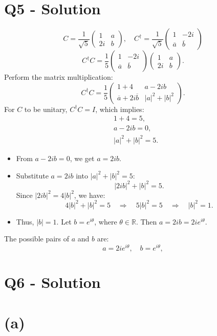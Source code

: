 \documentclass{article}
\begin{document}
\section*{Q5 - Solution}
\[
C = \frac{1}{\sqrt{5}} \begin{pmatrix} 1 & a \\  2i & b \end{pmatrix}, \quad
C^\dagger = \frac{1}{\sqrt{5}} \begin{pmatrix} 1 & -2i \\ \overline{a} & \overline{b} \end{pmatrix}
\]
\[
C^\dagger C = \frac{1}{5} \begin{pmatrix} 1 & -2i \\ \overline{a} & \overline{b} \end{pmatrix} \begin{pmatrix} 1 & a \\ 2i & b \end{pmatrix}.
\]
Perform the matrix multiplication:
\[
C^\dagger C = \frac{1}{5} \begin{pmatrix}
1 + 4 & a - 2ib \\
\overline{a} + 2i\overline{b} & |a|^2 + |b|^2
\end{pmatrix}.
\]
For \( C \) to be unitary, \( C^\dagger C = I \), which implies:
\[
\begin{aligned}
&1 + 4 = 5, \\
&a - 2ib = 0, \\
&|a|^2 + |b|^2 = 5.
\end{aligned}
\]
\begin{itemize}
\item From \( a - 2ib = 0 \), we get \( a = 2ib \).
\item Substitute \( a = 2ib \) into \( |a|^2 + |b|^2 = 5 \):
\[
|2ib|^2 + |b|^2 = 5.
\]
Since \( |2ib|^2 = 4|b|^2 \), we have:
\[
4|b|^2 + |b|^2 = 5 \quad \Rightarrow \quad 5|b|^2 = 5 \quad \Rightarrow \quad |b|^2 = 1.
\]
\item Thus, \( |b| = 1 \). Let \( b = e^{i\theta} \), where \( \theta \in \mathbb{R} \). Then \( a = 2i b = 2i e^{i\theta} \).
\end{itemize}
The possible pairs of \( a \) and \( b \) are:
\[
a = 2i e^{i\theta}, \quad b = e^{i\theta},
\]
\section*{Q6 - Solution}

\section*{(a)}
\end{document}
